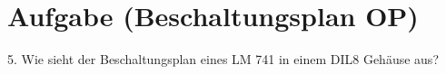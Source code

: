 \section{Aufgabe (Beschaltungsplan OP)}%
\label{sec:aufgabe_5}

5. Wie sieht der Beschaltungsplan eines LM 741 in einem DIL8 Gehäuse aus?
